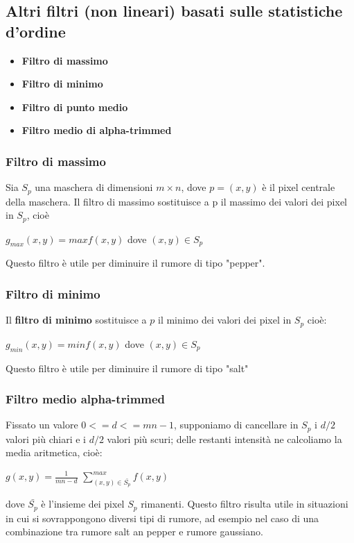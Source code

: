 \subsection{Altri filtri (non lineari) basati sulle statistiche d'ordine}
\begin{itemize}
    \item \textbf{Filtro di massimo}
    \item \textbf{Filtro di minimo}
    \item \textbf{Filtro di punto medio}
    \item \textbf{Filtro medio di alpha-trimmed}
\end{itemize}

\subsubsection{Filtro di massimo}
Sia $S_p$ una maschera di dimensioni $m × n$, dove $p = (x,y)$ è il pixel centrale della maschera.
Il filtro di massimo sostituisce a p il massimo dei valori dei pixel in $S_p$, cioè

\begin{center}
    $g_{max}(x,y)=max f(x,y)$ dove $(x,y) \in S_p$
\end{center}

Questo filtro è utile per diminuire il rumore di tipo "pepper".

\subsubsection{Filtro di minimo}
Il \textbf{filtro di minimo} sostituisce a $p$ il minimo dei valori dei pixel in $S_p$ cioè:

\begin{center}
    $g_{min}(x,y) = min f(x,y)$ dove $(x,y) \in S_p$
\end{center}

Questo filtro è utile per diminuire il rumore di tipo "salt"

\subsubsection{Filtro medio alpha-trimmed}
Fissato un valore $0 <= d <= mn − 1$, supponiamo di cancellare in $S_p$ i $d/2$ valori più chiari e i $d/2$ valori più scuri; delle
restanti intensità ne calcoliamo la media aritmetica, cioè:

\begin{center}
    $g(x,y) = \frac{1}{mn-d}$ $\sum_{(x,y) \in \bar{S_p}}^{max} f(x,y)$
\end{center}
dove $\bar{S_p}$ è l'insieme dei pixel $S_p$ rimanenti.
Questo filtro risulta utile in situazioni in cui si sovrappongono diversi tipi di rumore, ad esempio nel caso di una combinazione tra
rumore salt an pepper e rumore gaussiano.

